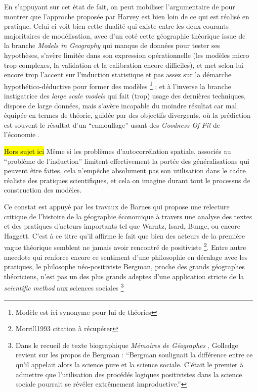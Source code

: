 En s'appuyant sur cet état de fait, on peut mobiliser l'argumentaire de \textcite{Wilson1972} pour montrer que l'approche proposée par Harvey est bien loin de ce qui est réalisé en pratique. Celui ci voit bien cette dualité qui existe entre les deux courants majoritaires de modélisation, avec d'un coté cette géographie théorique issue de la branche \textit{Models in Geography} qui manque de données pour tester ses hypothèses, s'avère limitée dans son expression opérationnelle (les modèles micro trop complexes, la validation et la calibration encore difficiles), et met selon lui encore trop l'accent sur l'induction statistique et pas assez sur la démarche hypothético-déductive pour former des modèles \footnote{Modèle est ici synonyme pour lui de théories} ; et à l'inverse la branche instigatrice des \textit{large scale models} qui fait (trop) usage des dernières techniques, dispose de large données, mais s'avère incapable du moindre résultat car mal équipée en termes de théorie, guidée par des objectifs divergents, où la prédiction est souvent le résultat d'un \enquote{camouflage} usant des \textit{Goodness Of Fit} de l'économie \autocite[10]{Batty1994}.

\hl{Hors sujet ici }
Même si les problèmes d'autocorrélation spatiale, associés au \enquote{problème de l'induction} limitent effectivement la portée des généralisations qui peuvent être faites, cela n’empêche absolument pas son utilisation dans le cadre réaliste des pratiques scientifiques, et cela on imagine durant tout le processus de construction des modèles.


Ce constat est appuyé par les travaux de Barnes qui propose une relecture critique de l'histoire de la géographie économique \autocite[122]{Barnes1996} à travers une analyse des textes et des pratiques d'acteurs importants tel que Warntz, Isard, Bunge, ou encore Haggett. C'est à ce titre qu'il affirme \autocite{Barnes2001a} le fait que bien des acteurs de la première vague théorique semblent ne jamais avoir rencontré de positiviste \footnote{Morrill1993 citation à récupérer}. Entre autre anecdote qui renforce encore ce sentiment d'une philosophie en décalage avec les pratiques, le philosophe néo-positiviste Bergman, proche des grands géographes théoriciens, n'est pas un des plus grands adeptes d'une application stricte de la \textit{scientific method} aux sciences sociales \footnote{Dans le recueil de texte biographique \textit{Mémoires de Géographes} \textcite[96]{Bailly2000}, Golledge revient sur les propos de Bergman : \enquote{Bergman soulignait la différence entre ce qu'il appelait alors la science pure et la science sociale. C'était le premier à admettre que l'utilisation des procédés logiques positivistes dans la science sociale pourrait se révéler extrêmement improductive.} } 

